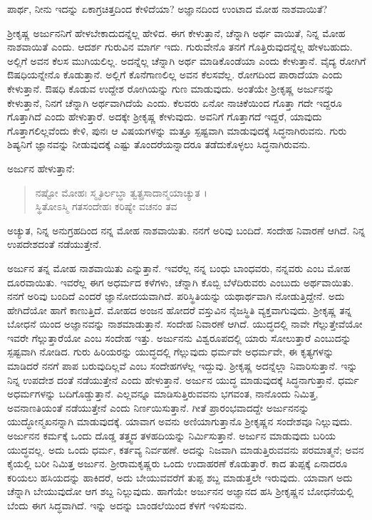 {\small ಪಾರ್ಥ, ನೀನು ಇದನ್ನು ಏಕಾಗ್ರಚಿತ್ತದಿಂದ ಕೇಳಿದೆಯಾ? ಅಜ್ಞಾನದಿಂದ ಉಂಟಾದ ಮೋಹ ನಾಶವಾಯಿತೆ?}

ಶ್ರೀಕೃಷ್ಣ ಅರ್ಜುನನಿಗೆ ಹೇಳಬೇಕಾದುದನ್ನೆಲ್ಲ ಹೇಳಿದ. ಈಗ ಕೇಳುತ್ತಾನೆ, ಚೆನ್ನಾಗಿ ಅರ್ಥ ವಾಯಿತೆ, ನಿನ್ನ ಮೋಹ ನಾಶವಾಯಿತೆ ಎಂದು. ಆದರ್ಶ ಗುರುವಿನ ಮಾರ್ಗ ಇದು. ಗುರುವೇನೊ ತನಗೆ ಗೊತ್ತಿರುವುದನ್ನೆಲ್ಲ ಹೇಳಬಹುದು. ಅಲ್ಲಿಗೆ ಅವನ ಕೆಲಸ ಮುಗಿಯಲಿಲ್ಲ. ಅದನ್ನೆಲ್ಲ ಚೆನ್ನಾಗಿ ಅರ್ಥ ಮಾಡಿಕೊಂಡೆಯಾ ಎಂದು ಕೇಳುತ್ತಾನೆ. ವೈದ್ಯ ರೋಗಿಗೆ ಔಷಧಿಯನ್ನೇನೊ ಕೊಡುತ್ತಾನೆ. ಅಲ್ಲಿಗೆ ಕೊನೆಗಾಣಲಿಲ್ಲ ಅವನ ಕೆಲಸವೆಲ್ಲ. ರೋಗದಿಂದ ಪಾರಾದೆಯಾ ಎಂದು ಕೇಳುತ್ತಾನೆ. ಔಷಧಿ ಕೊಡುವ ಉದ್ದೇಶ ರೋಗಿಯನ್ನು ಗುಣ ಮಾಡುವುದು. ಅಂತೆಯೇ ಶ್ರೀಕೃಷ್ಣ ಅರ್ಜುನನ್ನು ಕೇಳುತ್ತಾನೆ, ನಿನಗೆ ಚೆನ್ನಾಗಿ ಅರ್ಥವಾಗಿದೆಯೆ ಎಂದು. ಕೆಲವರು ಏನೋ ನಾಚಿಕೆಯಿಂದ ಗೊತ್ತಾ ಗದೇ ಇದ್ದರೂ ಗೊತ್ತಾಗಿದೆ ಎಂದು ಹೇಳುತ್ತಾರೆ. ಅದಕ್ಕೇ ಶ್ರೀಕೃಷ್ಣ ಕೇಳುವುದು. ಅವನಿಗೆ ಗೊತ್ತಾಗದೆ ಇದ್ದರೆ, ಯಾವುದು ಗೊತ್ತಾಗಲಿಲ್ಲವೆಂದು ಕೇಳಿ, ಪುನಃ ಆ ವಿಷಯಗಳನ್ನು ಮತ್ತೂ ಸ್ಪಷ್ಟವಾಗಿ ಮಾಡುವುದಕ್ಕೆ ಸಿದ್ಧನಾಗಿರುವನು. ಗುರು ಶಿಷ್ಯನಿಗೆ ಜ್ಞಾನವನ್ನು ನೀಡುವುದಕ್ಕೆ ಎಷ್ಟು ತೊಂದರೆಯನ್ನಾದರೂ ತಡೆದುಕೊಳ್ಳಲು ಸಿದ್ಧನಾಗಿರುವನು.

ಅರ್ಜುನ ಹೇಳುತ್ತಾನೆ:

\begin{verse}
ನಷ್ಟೋ ಮೋಹಃ ಸ್ಮೃತಿರ್ಲಬ್ಧಾ ತ್ವತ್ಪ್ರಸಾದಾನ್ಮಯಾಚ್ಯುತ ।\\ಸ್ಥಿತೋಽಸ್ಮಿ ಗತಸಂದೇಹಃ ಕರಿಷ್ಯೇ ವಚನಂ ತವ 
\end{verse}

{\small ಅಚ್ಯುತ, ನಿನ್ನ ಅನುಗ್ರಹದಿಂದ ನನ್ನ ಮೋಹ ನಾಶವಾಯಿತು. ನನಗೆ ಅರಿವು ಬಂದಿದೆ. ಸಂದೇಹ ನಿವಾರಣೆ ಆಗಿದೆ. ನಿನ್ನ ಉಪದೇಶದಂತೆ ನಡೆಯುತ್ತೇನೆ.}

ಅರ್ಜುನ ತನ್ನ ಮೋಹ ನಾಶವಾಯಿತು ಎನ್ನುತ್ತಾನೆ. ಇವರೆಲ್ಲ ನನ್ನ ಬಂಧು ಬಾಂಧವರು, ನನ್ನವರು ಎಂಬ ಮೋಹ ದೂರವಾಯಿತು. ಇವರೆಲ್ಲ ಈಗ ಅಧರ್ಮದ ಕಳೆಗಳು, ಚೆನ್ನಾಗಿ ಕೊಬ್ಬಿ ಬೆಳೆದಿರುವರು ಎಂಬುದು ಅರ್ಥವಾಯಿತು. ನನಗೆ ಅರಿವು ಬಂದಿದೆ ಎಂದರೆ ಜ್ಞಾನೋದಯವಾಗಿದೆ. ಪರಿಸ್ಥಿತಿಯನ್ನು ಯಥಾರ್ಥವಾಗಿ ನೋಡುತ್ತಿದ್ದೇನೆ. ಅದು ಹೇಗಿದೆಯೋ ಹಾಗೆ ಕಾಣುತ್ತಿದೆ. ಮೋಹದ ಅಂಜನ ಹೋದರೆ ವಸ್ತುವಿನ ನೈಜಸ್ಥಿತಿ ವ್ಯಕ್ತವಾಗುವುದು. ಶ್ರೀಕೃಷ್ಣ ತನ್ನ ಬೋಧನೆ ಯಿಂದ ಅಜ್ಞಾನವನ್ನು ನಾಶಮಾಡುತ್ತಾನೆ. ಸಂದೇಹ ನಿವಾರಣೆ ಆಗಿದೆ. ಯುದ್ಧದಲ್ಲಿ ನಾವೇ ಗೆಲ್ಲುತ್ತೇವೆಯೋ ಇವರೇ ಗೆಲ್ಲುತ್ತಾರೆಯೋ ಎಂಬ ಸಂದೇಹ ಇತ್ತು. ಅರ್ಜುನನು ವಿಶ್ವರೂಪದಲ್ಲಿ ಯಾರು ಸೋಲುತ್ತಾರೆ ಎಂಬುದನ್ನು ಸ್ಪಷ್ಟವಾಗಿ ನೋಡಿದ. ಗುರು ಹಿರಿಯರನ್ನು ಯುದ್ಧದಲ್ಲಿ ಗೆಲ್ಲುವುದು ಧರ್ಮವೇ ಅಧರ್ಮವೇ, ಈ ಕೃತ್ಯಗಳನ್ನು ಮಾಡಿದರೆ ನನಗೆ ಪಾಪ ಬರುವುದಿಲ್ಲವೆ ಎಂಬ ಸಂದೇಹಗಳೆಲ್ಲ ಇದ್ದುವು. ಶ್ರೀಕೃಷ್ಣ ಅದನ್ನೆಲ್ಲಾ ನಿವಾರಿಸುತ್ತಾನೆ. ಇನ್ನು ನಿನ್ನ ಉಪದೇಶ ದಂತೆ ನಡೆಯುತ್ತೇನೆ ಎಂದು ಹೇಳುತ್ತಾನೆ. ಅರ್ಜುನ ಯುದ್ಧ ಮಾಡುವುದಕ್ಕೆ ಸಿದ್ಧನಾಗುತ್ತಾನೆ. ಧರ್ಮ ಅಧರ್ಮಗಳನ್ನು ಬದಿಗೊಡ್ಡುತ್ತಾನೆ. ಎಲ್ಲವನ್ನೂ ಮಾಡಿಸುತ್ತಿರುವವನು ಭಗವಂತ, ನಾನೊಂದು ನಿಮಿತ್ತ, ಅವನಾಣತಿಯಂತೆ ನಡೆಯುತ್ತೇನೆ ಎಂದು ನಿರ್ಣಯಿಸುತ್ತಾನೆ. ಗೀತೆ ಪ್ರಾರಂಭವಾದದ್ದೇ ಅರ್ಜುನನನ್ನು ಯುದ್ಧೋನ್ಮಖನನ್ನಾಗಿ ಮಾಡುವುದಕ್ಕೆ. ಯಾವಾಗ ಅವನು ಅಣಿಯಾಗುತ್ತಾನೊ ಶ್ರೀಕೃಷ್ಣನ ಸಂದೇಶವೂ ನಿಲ್ಲುವುದು. ಅರ್ಜುನನ ಕರ್ಮಕ್ಕೆ ಒಂದು ದೊಡ್ಡ ತತ್ತ್ವದ ತಳಹದಿಯನ್ನು ನಿರ್ಮಿಸುತ್ತಾನೆ. ಅರ್ಜುನ ಮಾಡುವುದು ಬರಿಯ ಯುದ್ಧವಲ್ಲ. ಅದು ಒಂದು ಧರ್ಮ, ಕರ್ತವ್ಯ ನಿರ್ವಹಣೆ. ಅದನ್ನು ನಿಜವಾಗಿ ಮಾಡುತ್ತಿರುವವನು ಪರಮಾತ್ಮನೆ; ಅವನ ಕೈಯಲ್ಲಿ ಬರೀ ನಿಮಿತ್ತ ಅರ್ಜುನ. ಶ್ರೀರಾಮಕೃಷ್ಣರು ಒಂದು ಉದಾಹರಣೆ ಕೊಡುತ್ತಾರೆ. ಕಾದ ತುಪ್ಪಕ್ಕೆ ಏನಾದರೂ ಕರಿಯಲು ಹಸಿಯದನ್ನು ಹಾಕಿದರೆ, ಅದು ಬೇಯುವವರೆಗೆ ತುಪ್ಪ ಶಬ್ದ ಮಾಡುತ್ತಲೇ ಇರುವುದು. ಯಾವಾಗ ಅದು ಚೆನ್ನಾಗಿ ಬೇಯುವುದೋ ಆಗ ಶಬ್ದ ನಿಲ್ಲುವುದು. ಹಾಗೆಯೇ ಅರ್ಜುನನ ಅಜ್ಞಾನದ ಹಸಿ ಶ್ರೀಕೃಷ್ಣನ ಬೋಧನೆಯಲ್ಲಿ ಬೆಂದು ಈಗ ಸಿದ್ಧವಾಗಿದೆ. ಇನ್ನು ಅದನ್ನು ಬಾಂಡಲೆಯಿಂದ ಕೆಳಗೆ ಇಳಿಸುವನು.

